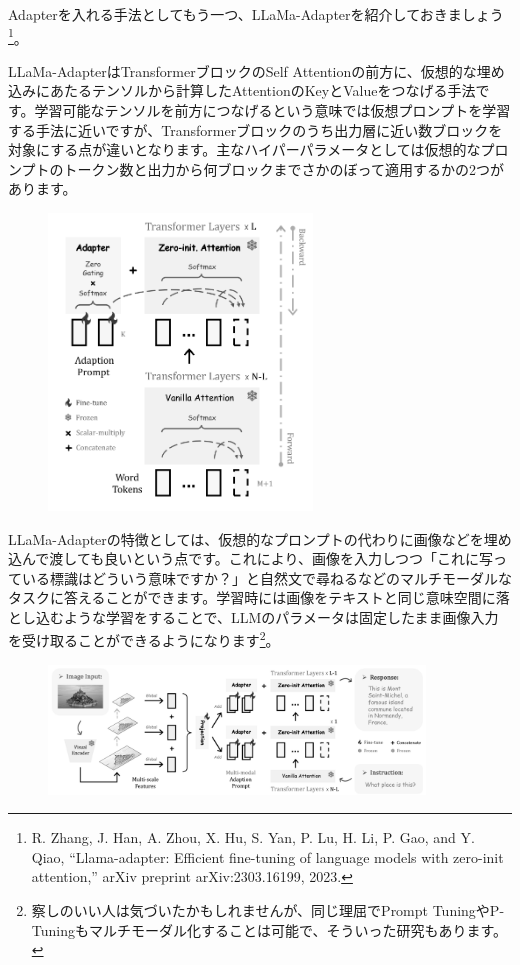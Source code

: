 \documentclass[a5paper,twoside,dvipdfmx]{jsarticle}
\begin{document}
Adapterを入れる手法としてもう一つ、LLaMa-Adapterを紹介しておきましょう\footnote{R. Zhang, J. Han, A. Zhou, X. Hu, S. Yan, P. Lu, H. Li, P. Gao, and Y. Qiao, “Llama-adapter: Efficient fine-tuning of language models with zero-init attention,” arXiv preprint arXiv:2303.16199, 2023.}。

\newpage

LLaMa-AdapterはTransformerブロックのSelf Attentionの前方に、仮想的な埋め込みにあたるテンソルから計算したAttentionのKeyとValueをつなげる手法です。学習可能なテンソルを前方につなげるという意味では仮想プロンプトを学習する手法に近いですが、Transformerブロックのうち出力層に近い数ブロックを対象にする点が違いとなります。主なハイパーパラメータとしては仮想的なプロンプトのトークン数と出力から何ブロックまでさかのぼって適用するかの2つがあります。


\begin{figure}[h]
  \centering
  \includegraphics[width=70mm]{../C105Fig/gray/llama_adapter_image.png}
 \end{figure} 

 \newpage

LLaMa-Adapterの特徴としては、仮想的なプロンプトの代わりに画像などを埋め込んで渡しても良いという点です。これにより、画像を入力しつつ「これに写っている標識はどういう意味ですか？」と自然文で尋ねるなどのマルチモーダルなタスクに答えることができます。学習時には画像をテキストと同じ意味空間に落とし込むような学習をすることで、LLMのパラメータは固定したまま画像入力を受け取ることができるようになります\footnote{察しのいい人は気づいたかもしれませんが、同じ理屈でPrompt TuningやP-Tuningもマルチモーダル化することは可能で、そういった研究もあります。}。


\begin{figure}[h]
  \centering
  \includegraphics[width=100mm]{../C105Fig/gray/llama_adapter_image2.png}
 \end{figure} 
\end{document}

